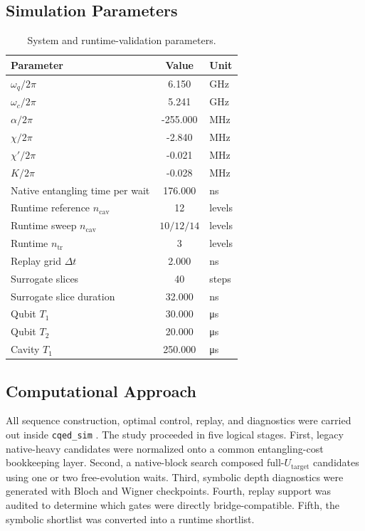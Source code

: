 \documentclass[aps,pra,twocolumn,reprint,amsmath,amssymb]{revtex4-2}
\begin{document}
\subsection{Simulation Parameters}

\begin{table}[H]
  \centering
  \caption{System and runtime-validation parameters.}
  \begin{tabular}{@{} l c l @{} }
    \toprule
    Parameter & {Value} & Unit \\
    \midrule
    $\omega_q / 2\pi$ & 6.150 & GHz \\
    $\omega_c / 2\pi$ & 5.241 & GHz \\
    $\alpha / 2\pi$ & -255.000 & MHz \\
    $\chi / 2\pi$ & -2.840 & MHz \\
    $\chi' / 2\pi$ & -0.021 & MHz \\
    $K / 2\pi$ & -0.028 & MHz \\
    Native entangling time per wait & 176.000 & ns \\
    Runtime reference $n_{\mathrm{cav}}$ & 12 & levels \\
    Runtime sweep $n_{\mathrm{cav}}$ & \multicolumn{1}{c}{$10/12/14$} & levels \\
    Runtime $n_{\mathrm{tr}}$ & 3 & levels \\
    Replay grid $\Delta t$ & 2.000 & ns \\
    Surrogate slices & 40 & steps \\
    Surrogate slice duration & 32.000 & ns \\
    Qubit $T_1$ & 30.000 & \si{\micro\second} \\
    Qubit $T_2$ & 20.000 & \si{\micro\second} \\
    Cavity $T_1$ & 250.000 & \si{\micro\second} \\
    \bottomrule
  \end{tabular}
\end{table}

\subsection{Computational Approach}

All sequence construction, optimal control, replay, and diagnostics were carried
out inside \texttt{cqed\_sim} \cite{cqed_sim}. The study proceeded in five
logical stages. First, legacy native-heavy candidates were normalized onto a
common entangling-cost bookkeeping layer. Second, a native-block search composed
full-$U_{\mathrm{target}}$ candidates using one or two free-evolution waits.
Third, symbolic depth diagnostics were generated with Bloch and Wigner
checkpoints. Fourth, replay support was audited to determine which gates were
directly bridge-compatible. Fifth, the symbolic shortlist was converted into a
runtime shortlist.
\end{document}
